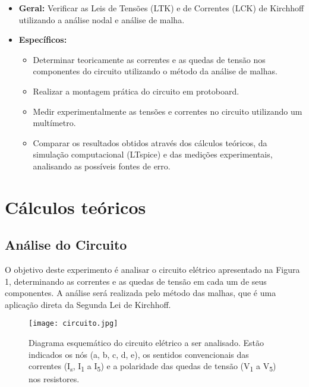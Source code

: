 \documentclass[a4paper, 12pt]{article}
\begin{document}
\begin{itemize}
\item \textbf{Geral:} Verificar as Leis de Tensões (LTK) e de Correntes (LCK) de Kirchhoff utilizando a
análise nodal e análise de malha.
\item \textbf{Específicos:}
\begin{itemize}
    \item Determinar teoricamente as correntes e as quedas de tensão nos componentes do circuito utilizando o método da análise de malhas.
    \item Realizar a montagem prática do circuito em protoboard.
    \item Medir experimentalmente as tensões e correntes no circuito utilizando um multímetro.
    \item Comparar os resultados obtidos através dos cálculos teóricos, da simulação computacional (LTspice) e das medições experimentais, analisando as possíveis fontes de erro.
\end{itemize}
\end{itemize}

\section{Cálculos teóricos}

\subsection{Análise do Circuito}
O objetivo deste experimento é analisar o circuito elétrico apresentado na Figura 1, determinando as correntes e as quedas de tensão em cada um de seus componentes. A análise será realizada pelo método das malhas, que é uma aplicação direta da Segunda Lei de Kirchhoff.

\begin{figure}[h!]
\centering
\texttt{[image: circuito.jpg]}
\caption{Diagrama esquemático do circuito elétrico a ser analisado. Estão indicados os nós (a, b, c, d, e), os sentidos convencionais das correntes (I\textsubscript{s}, I\textsubscript{1} a I\textsubscript{5}) e a polaridade das quedas de tensão (V\textsubscript{1} a V\textsubscript{5}) nos resistores.}
\label{fig:diagrama_circuito_analise}
\end{figure}
\end{document}
